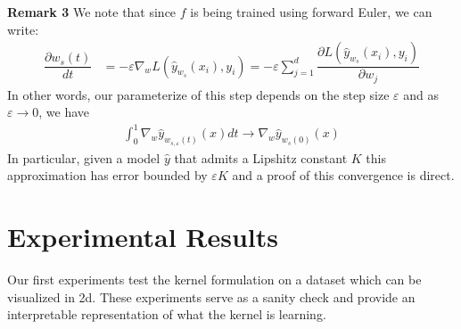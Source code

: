 \textbf{Remark 3} We note that since $f$ is being trained using forward Euler, we can write:
\begin{align}
    \dfrac{\partial w_s(t)}{dt} &= -\varepsilon \nabla_w L(\hat y_{w_s}(x_i), y_i) = -\varepsilon \sum_{j = 1}^{d} \dfrac{\partial L(\hat y_{w_s}(x_i),  y_i)}{\partial w_j} \label{eq10}
\end{align}
In other words, our parameterize of this step depends on the step size $\varepsilon$ and as $\varepsilon \to 0$, we have 
\begin{align}
    \int_0^1 \nabla_w \hat y_{w_{s, \varepsilon}(t)}(x)dt \to \nabla_w \hat y_{w_s(0)}(x)
\end{align}
In particular, given a model $\hat y$ that admits a Lipshitz constant $K$ this approximation has error bounded by $\varepsilon K$ and a proof of this convergence is direct. 

\section{Experimental Results}

    Our first experiments test the kernel formulation on a dataset 
    which can be visualized in 2d. These experiments serve as a sanity check
    and provide an interpretable representation of what the kernel is learning.

